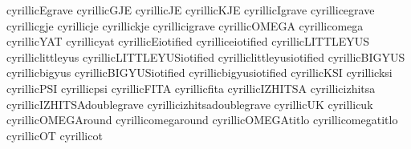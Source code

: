 \stopencoding


 cyrillicEgrave             {}
 cyrillicGJE                {}
 cyrillicJE                 {}
 cyrillicKJE                {}
 cyrillicIgrave             {}
 cyrillicegrave             {}
 cyrillicgje                {}
 cyrillicje                 {}
 cyrillickje                {}
 cyrillicigrave             {}
 cyrillicOMEGA              {}
 cyrillicomega              {}
 cyrillicYAT                {}
 cyrillicyat                {}
 cyrillicEiotified          {}
 cyrilliceiotified          {}
 cyrillicLITTLEYUS          {}
 cyrilliclittleyus          {}
 cyrillicLITTLEYUSiotified  {}
 cyrilliclittleyusiotified  {}
 cyrillicBIGYUS             {}
 cyrillicbigyus             {}
 cyrillicBIGYUSiotified     {}
 cyrillicbigyusiotified     {}
 cyrillicKSI                {}
 cyrillicksi                {}
 cyrillicPSI                {}
 cyrillicpsi                {}
 cyrillicFITA               {}
 cyrillicfita               {}
 cyrillicIZHITSA            {}
 cyrillicizhitsa            {}
 cyrillicIZHITSAdoublegrave {}
 cyrillicizhitsadoublegrave {}
 cyrillicUK                 {}
 cyrillicuk                 {}
 cyrillicOMEGAround         {}
 cyrillicomegaround         {}
 cyrillicOMEGAtitlo         {}
 cyrillicomegatitlo         {}
 cyrillicOT                 {}
 cyrillicot                 {}

